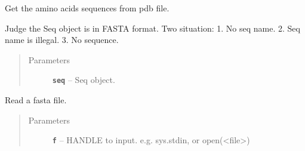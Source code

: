\documentclass[letterpaper,10pt,english]{sphinxmanual}
\begin{document}
\begin{fulllineitems}
\label{reference/GetProtein:GetProtein.GetSeqFromPDB}
Get the amino acids sequences from pdb file.

\end{fulllineitems}


\begin{fulllineitems}
\label{reference/GetProtein:GetProtein.IsFasta}
Judge the Seq object is in FASTA format.
Two situation:
1. No seq name.
2. Seq name is illegal.
3. No sequence.
\begin{quote}\begin{description}
\item[{Parameters}] \leavevmode
\textbf{\texttt{seq}} -- Seq object.

\end{description}\end{quote}

\end{fulllineitems}


\begin{fulllineitems}
\label{reference/GetProtein:GetProtein.ReadFasta}
Read a fasta file.
\begin{quote}\begin{description}
\item[{Parameters}] \leavevmode
\textbf{\texttt{f}} -- HANDLE to input. e.g. sys.stdin, or open(\textless{}file\textgreater{})

\end{description}\end{quote}

\end{fulllineitems}


\begin{fulllineitems}
\label{reference/GetProtein:GetProtein.Seq}
\end{fulllineitems}
\end{document}
